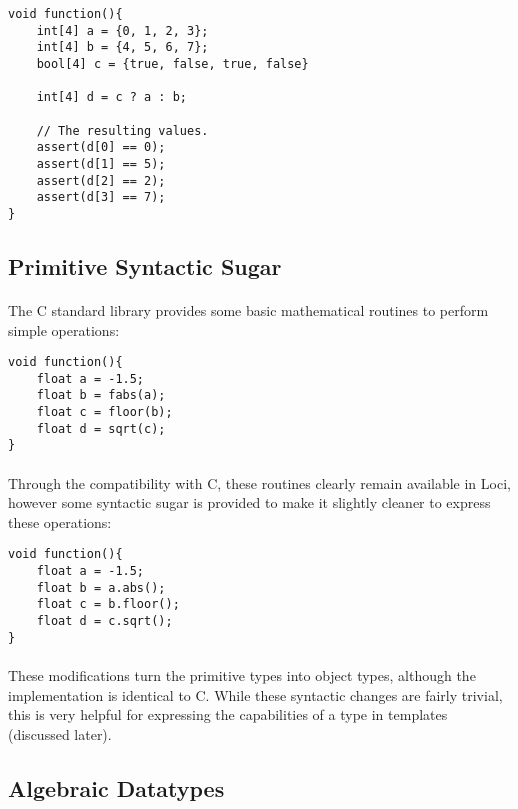 \documentclass[12pt,twoside,notitlepage]{report}
\begin{document}
\begin{lstlisting}
void function(){
	int[4] a = {0, 1, 2, 3};
	int[4] b = {4, 5, 6, 7};
	bool[4] c = {true, false, true, false}
	
	int[4] d = c ? a : b;
	
	// The resulting values.
	assert(d[0] == 0);
	assert(d[1] == 5);
	assert(d[2] == 2);
	assert(d[3] == 7);
}
\end{lstlisting}


\clearpage

\subsection{Primitive Syntactic Sugar}

\paragraph{}
The C standard library provides some basic mathematical routines to perform simple operations:


\begin{lstlisting}
void function(){
	float a = -1.5;
	float b = fabs(a);
	float c = floor(b);
	float d = sqrt(c);
}
\end{lstlisting}


\paragraph{}
Through the compatibility with C, these routines clearly remain available in Loci, however some syntactic sugar is provided to make it slightly cleaner to express these operations:


\begin{lstlisting}
void function(){
	float a = -1.5;
	float b = a.abs();
	float c = b.floor();
	float d = c.sqrt();
}
\end{lstlisting}


\paragraph{}
These modifications turn the primitive types into object types, although the implementation is identical to C. While these syntactic changes are fairly trivial, this is very helpful for expressing the capabilities of a type in templates (discussed later).

\clearpage

\subsection{Algebraic Datatypes}
\end{document}
